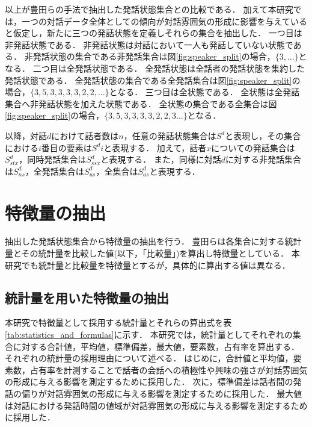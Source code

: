 以上が豊田らの手法で抽出した発話状態集合との比較である．
加えて本研究では，一つの対話データ全体としての傾向が対話雰囲気の形成に影響を与えていると仮定し，新たに三つの発話状態を定義しそれらの集合を抽出した．
一つ目は非発話状態である．
非発話状態は対話において一人も発話していない状態である．
非発話状態の集合である非発話集合は図\ref{fig:speaker_split}の場合，$\{3, ...\}$となる．
二つ目は全発話状態である．
全発話状態は全話者の発話状態を集約した発話状態である．
全発話状態の集合である全発話集合は図\ref{fig:speaker_split}の場合，$\{3, 5, 3, 3, 3, 3, 2, 2, ...\}$となる．
三つ目は全状態である．
全状態は全発話集合へ非発話状態を加えた状態である．
全状態の集合である全集合は図\ref{fig:speaker_split}の場合，$\{3, 5, 3, 3, 3, 3, 2, 2, 3 ...\}$となる．

以降，対話$d$におけて話者数は$n$，任意の発話状態集合は$S^d$と表現し，その集合における$i$番目の要素は$S^di$と表現する．
加えて，話者$x$についての発話集合は$S^d_{stx}$，同時発話集合は$S^d_{ssx}$と表現する．
また，同様に対話$d$に対する非発話集合は$S^d_{ns}$，全発話集合は$S^d_{us}$，全集合は$S^d_{as}$と表現する．

\section{特徴量の抽出\label{node:pickup_feature}}

抽出した発話状態集合から特徴量の抽出を行う．
豊田らは各集合に対する統計量とその統計量を比較した値(以下，「比較量」)を算出し特徴量としている．
本研究でも統計量と比較量を特徴量とするが，具体的に算出する値は異なる．

\subsection{統計量を用いた特徴量の抽出}

本研究で特徴量として採用する統計量とそれらの算出式を表\ref{tab:statistics_and_formulas}に示す．
本研究では，統計量としてそれぞれの集合に対する合計値，平均値，標準偏差，最大値，要素数，占有率を算出する．
それぞれの統計量の採用理由について述べる．
はじめに，合計値と平均値，要素数，占有率を計測することで話者の会話への積極性や興味の強さが対話雰囲気の形成に与える影響を測定するために採用した．
次に，標準偏差は話者間の発話の偏りが対話雰囲気の形成に与える影響を測定するために採用した．
最大値は対話における発話時間の値域が対話雰囲気の形成に与える影響を測定するために採用した．

